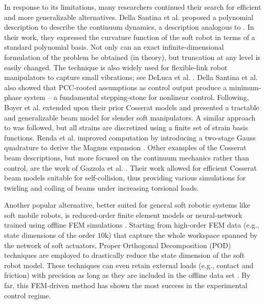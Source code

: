 In response to its limitations, many researchers continued their search for efficient and more generalizable alternatives. Della Santina et al. \cite{DellaSantina2020} proposed a polynomial description to describe the continuum dynamics, a description analogous to \cite{Chirikjian1992}. In their work, they expressed the curvature function of the soft robot in terms of a standard polynomial basis. Not only can an exact infinite-dimensional formulation of the problem be obtained (in theory), but truncation at any level is easily changed. The technique is also widely used for flexible-link robot manipulators to capture small vibrations; see DeLuca et al. \cite{DeLuca2016Jul}. Della Santina et al. also showed that PCC-rooted assumptions as control output produce a minimum-phase system \cite{DellaSantina2020} -- a fundamental stepping-stone for nonlinear control. Following, Boyer et al. \cite{Boyer2021} extended upon their prior Cosserat models \cite{Renda2018,Renda2020} and presented a tractable and generalizable beam model for slender soft manipulators. A similar approach to \cite{DellaSantina2020} was followed, but all strains are discretized using a finite set of strain basis functions. Renda et al. \cite{Renda2020} improved computation by introducing a two-stage Gauss quadrature \cite{Zanna1999} to derive the Magnus expansion \cite{Hairer2002}. Other examples of the Cosserat beam descriptions, but more focused on the continuum mechanics rather than control, are the work of Gazzola et al. \cite{Gazzola2018}. Their work allowed for efficient Cosserat beam models suitable for self-collision, thus providing various simulations for twirling and coiling of beams under increasing torsional loads.

Another popular alternative, better suited for general soft robotic systems like soft mobile robots, is reduced-order finite element models \cite{Duriez2013,Coevoet2017,Coevoet2017Feb,Goury2018,Thieffry2017,Thieffry2020,Tonkens2021May,Katzschmann2019Apr,Wu2021Feb,Zhang2017} or neural-network trained using offline FEM simulations \cite{Fang2020Dec}. Starting from high-order FEM data (e.g., state dimensions of the order $10$k) that capture the whole workspace spanned by the network of soft actuators, Proper Orthogonal Decomposition (POD) techniques are employed to drastically reduce the state dimension of the soft robot model. These techniques can even retain external loads (e.g., contact and friction) with precision as long as they are included in the offline data set \cite{Goury2018}. By far, this FEM-driven method has shown the most success in the experimental control regime.

